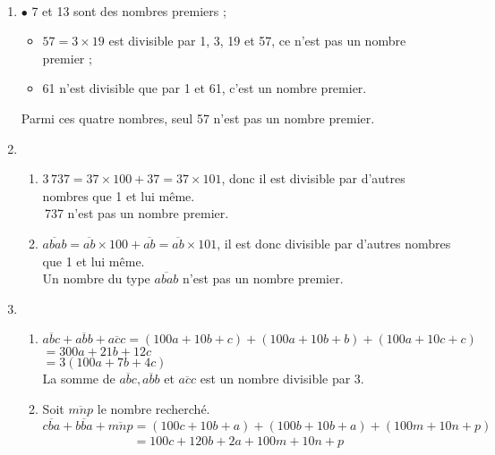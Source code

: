 \ \\ [-5mm]
   \begin{enumerate}
      \item \textcolor{G1}{$\bullet$} 7 et 13 sont des nombres premiers ;
         \begin{itemize}
            \item $57 =3\times19$ est divisible par 1, 3, 19 et 57, ce n'est pas un nombre premier ;
            \item 61 n'est divisible que par 1 et 61, c'est un nombre premier.
         \end{itemize}
         {\blue Parmi ces quatre nombres, seul 57 n'est pas un nombre premier.}
      \item
         \begin{enumerate}
            \item $3\,737 =37\times100+37 =37\times101$, donc il est divisible par d'autres nombres que 1 et lui même. \\
               {\,737 n'est pas un nombre premier.}
            \item $\overline{abab} =\overline{ab}\times100+\overline{ab} =\overline{ab}\times101$, il est donc divisible par d'autres nombres que 1 et lui même. \\
               {\blue Un nombre du type $\overline{abab}$ n'est pas un nombre premier.}
         \end{enumerate}
      \setcounter{enumi}{2}
      \item
         \begin{enumerate}
            \item $\overline{abc}+\overline{abb}+\overline{acc} =(100a+10b+c)+(100a+10b+b)+(100a+10c+c)$ \\
               \hspace*{3.1cm} $=300a+21b+12c$ \\
               \hspace*{3.1cm} $=3(100a+7b+4c)$ \\
               {\blue La somme de $\overline{abc}, \overline{abb}$ et $\overline{acc}$ est un nombre divisible par 3.}
            \item Soit $\overline{mnp}$ le nombre recherché. \\
               $\overline{cba}+\overline{bba}+\overline{mnp} =(100c+10b+a)+(100b+10b+a)+(100m+10n+p)$ \\
               $\phantom{\overline{cba}+\overline{bba}+\overline{mnp}} =100c+120b+2a+100m+10n+p$ \\

\end{enumerate}
\end{enumerate}
